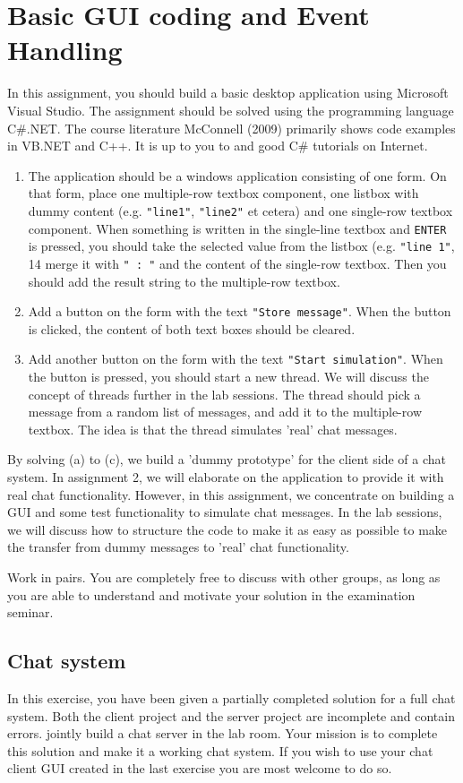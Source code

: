 \documentclass{article}
\begin{document}
\pagebreak
\section{Basic GUI coding and Event Handling}
In this assignment, you should build a basic desktop application using Microsoft Visual Studio. The assignment should be solved using the programming language C\#.NET. The course literature McConnell (2009) primarily shows code examples in VB.NET and C++. It is up to you to and good C\# tutorials on Internet.
\begin{enumerate}
  \item The application should be a windows application consisting of one form. On that form, place one multiple-row textbox component, one listbox with dummy content (e.g. \texttt{"line1"}, \texttt{"line2"} et cetera) and one single-row textbox component. When something is written in the single-line textbox and \texttt{ENTER} is pressed, you should take the selected value from the listbox (e.g. \texttt{"line 1"}, 14 merge it with \texttt{" : "} and the content of the single-row textbox. Then you should add the result string to the multiple-row textbox.
  \item Add a button on the form with the text \texttt{"Store message"}. When the button is clicked, the content of both text boxes should be cleared.
  \item Add another button on the form with the text \texttt{"Start simulation"}. When the button is pressed, you should start a new thread. We will discuss the concept of threads further in the lab sessions. The thread should pick a message from a random list of messages, and add it to the multiple-row textbox. The idea is that the thread simulates 'real' chat messages.
\end{enumerate}
By solving (a) to (c), we build a 'dummy prototype' for the client side of a chat system. In assignment 2, we will elaborate on the application to provide it with real chat functionality. However, in this assignment, we concentrate on building a GUI and some test functionality to simulate chat messages. In the lab sessions, we will discuss how to structure the code to make it as easy as possible to make the transfer from dummy messages to 'real' chat functionality.

Work in pairs. You are completely free to discuss with other groups, as long as you are able to understand and motivate your solution in the examination seminar.
\subsection{Chat system}
In this exercise, you have been given a partially completed solution for a full chat system. Both the client project and the server project are incomplete and contain errors. jointly build a chat server in the lab room. Your mission is to complete this solution and make it a working chat system. If you wish to use your chat client GUI created in the last exercise you are most welcome to do so.
\end{document}
